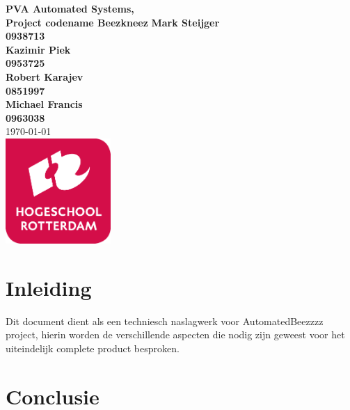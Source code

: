 \documentclass{article}
\begin{document}
\sffamily
\begin{titlepage}
  \centering
    \vfill
    {\bfseries\Huge
      PVA Automated Systems, \\
      Project codename Beezkneez
        \vskip2cm
      }
      {\bfseries\Large
        Mark Steijger\\
      }
      {
        \bfseries\normalsize
        0938713\\
            \vskip1cm
    }
          {\bfseries\Large
        Kazimir Piek\\
      }
      {
        \bfseries\normalsize
        0953725\\
            \vskip1cm
    }      {\bfseries\Large
        Robert Karajev\\
      }
      {
        \bfseries\normalsize
        0851997\\
            \vskip1cm
    }      {\bfseries\Large
        Michael Francis\\
      }
      {
        \bfseries\normalsize
        0963038\\
            \vskip1cm
    }
            \vskip1cm
        \today\\
    \vfill
    \includegraphics[width=4cm]{logohr.png} %
    \vfill
    \vfill
\end{titlepage}
\newpage
\tableofcontents

\newpage
\section{Inleiding}
Dit document dient als een techniesch naslagwerk voor AutomatedBeezzzz project, hierin worden de verschillende aspecten
die nodig zijn geweest voor het uiteindelijk complete product besproken. \cite{akbari_mohammadi_ziarati_2010}










\section{Conclusie}


\newpage


\end{document}
